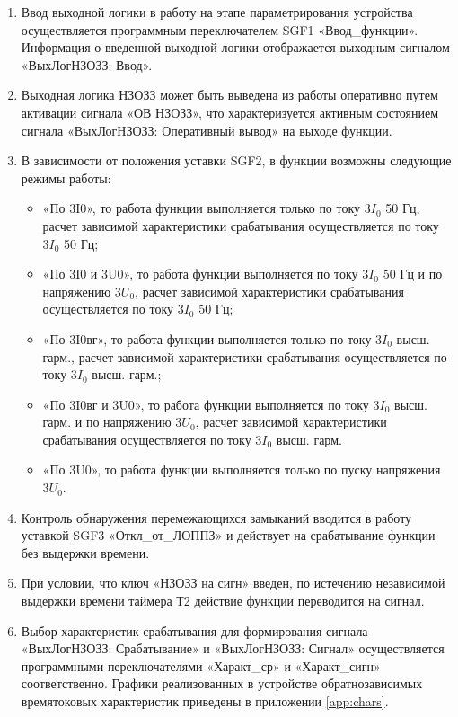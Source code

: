 \begin{enumerate}
\begin{enumerate}
\item 
Ввод выходной логики в работу на этапе параметрирования устройства осуществляется программным переключателем SGF1 «Ввод\_функции». Информация о введенной выходной логики отображается выходным сигналом «ВыхЛогНЗОЗЗ: Ввод».

\item
Выходная логика НЗОЗЗ может быть выведена из работы оперативно путем активации сигнала «ОВ НЗОЗЗ», что характеризуется активным состоянием сигнала «ВыхЛогНЗОЗЗ: Оперативный вывод» на выходе функции.

\item
В зависимости от положения уставки SGF2, в функции возможны следующие режимы работы:
\begin{itemize}
    \item «По 3I0», то работа функции выполняется только по току $3I_0$ 50 Гц, расчет зависимой характеристики срабатывания осуществляется по току $3I_0$ 50 Гц;
    \item «По 3I0 и 3U0», то работа функции выполняется по току $3I_0$ 50 Гц и по напряжению $3U_0$, расчет зависимой характеристики срабатывания осуществляется по току $3I_0$ 50 Гц;
    \item «По 3I0вг», то работа функции выполняется только по току $3I_0$ высш. гарм., расчет зависимой характеристики срабатывания осуществляется по току $3I_0$ высш. гарм.;
    \item «По 3I0вг и 3U0», то работа функции выполняется по току $3I_0$ высш. гарм. и по напряжению $3U_0$, расчет зависимой характеристики срабатывания осуществляется по току $3I_0$ высш. гарм.
    \item «По 3U0», то работа функции выполняется только по пуску напряжения $3U_0$.
\end{itemize}

\item\sloppy
Контроль обнаружения перемежающихся замыканий вводится в работу уставкой SGF3 «Откл\_от\_ЛОППЗ» и действует на срабатывание функции без выдержки времени.

\item
При условии, что ключ «НЗОЗЗ на сигн» введен, по истечению независимой выдержки времени таймера Т2 действие функции переводится на сигнал.

\item
Выбор характеристик срабатывания для формирования сигнала  «ВыхЛогНЗОЗЗ: Срабатывание» и «ВыхЛогНЗОЗЗ: Сигнал» осуществляется программными переключателями «Характ\_ср» и «Характ\_сигн» соответственно. Графики реализованных в устройстве обратнозависимых времятоковых характеристик приведены в приложении \ref{app:chars}.


\end{enumerate}
\end{enumerate}
